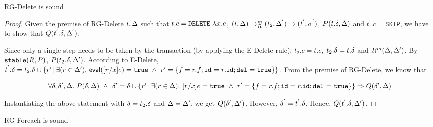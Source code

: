 \documentclass[acmlarge,anonymous]{acmart}\settopmatter{printfolios=true}
\begin{document}
\begin{theorem}
RG-Delete is sound
\end{theorem}

\begin{proof}
Given the premise of RG-Delete $t, \Delta$ such that $t.c = \texttt{DELETE}\;\lambda x.e$, $(t, \Delta) \rightarrow_{R}^{m} (t_2, \Delta^{'}) \rightarrow (t^{'}, \sigma^{'})$, $P(t.\delta, \Delta)$ and $t^{'}.c = \texttt{SKIP}$, we have to show that $Q(t^{'}.\delta, \Delta^{'})$. 

Since only a single step needs to be taken by the transaction (by applying the E-Delete rule), $t_2.c = t.c$, $t_2.\delta = t.\delta$ and $R^m(\Delta, \Delta')$. By $\mathtt{stable}(R, P)$, $P(t_2.\delta, \Delta')$. According to E-Delete,  $t^{'}.\delta = t_2.\delta \cup \{r' \,|\, \exists(r\in\Delta').~ \textsf{eval}([r/x]e)={\tt true} ~\wedge~ r'=\{\bar{f}=r.\bar{f}; \texttt{id}=r.\texttt{id};\texttt{del}={\tt true}\}\}$. From the premise of RG-Delete, we know that 

$$
\forall\delta,\delta',\Delta.~P(\delta,\Delta) ~\wedge~ 
  \delta' = \delta \cup \{r' \,|\, \exists(r\in\Delta).~ [r/x]e={\tt true}
        ~\wedge~ r'=\{\bar{f}=r.\bar{f}; \texttt{id}=r.\texttt{id};
        \texttt{del}={\tt true}\}\}  \Rightarrow 
  Q(\delta',\Delta)
$$

Instantiating the above statement with $\delta = t_2.\delta$ and $\Delta = \Delta'$, we get $Q(\delta',\Delta')$. However, $\delta^{'} = t^{'}.\delta$. Hence, $Q(t^{'}.\delta,\Delta')$.
\end{proof}


\begin{theorem}
RG-Foreach is sound
\end{theorem}
\end{document}
